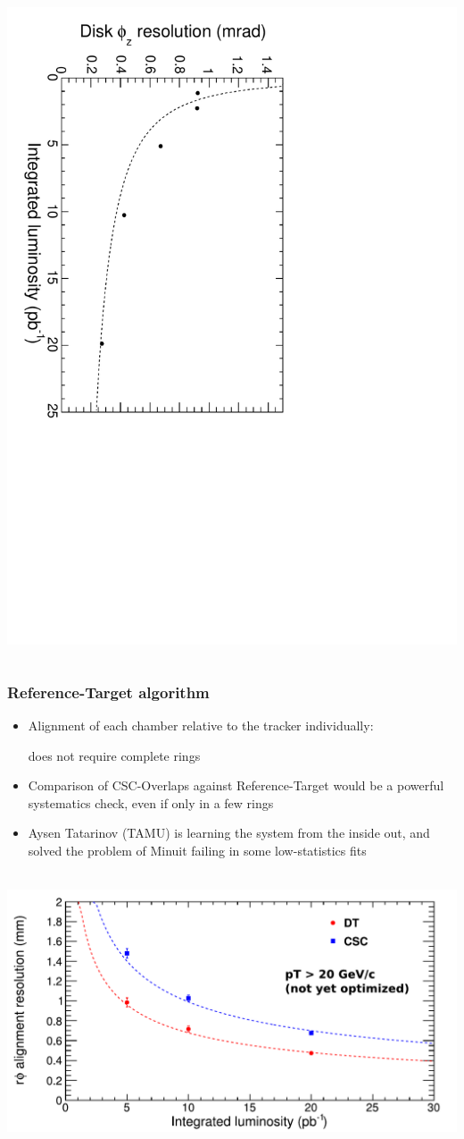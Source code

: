 \documentclass[compress]{beamer}
\begin{document}
\begin{frame}
\begin{columns}
\includegraphics[height=\linewidth, angle=90]{mccsc_diskstats_phiz.pdf}
\end{columns}
\end{frame}

\begin{frame}
\frametitle{Reference-Target algorithm}

\begin{itemize}
\item Alignment of each chamber relative to the tracker individually:

does not require complete rings
\item Comparison of CSC-Overlaps against Reference-Target would be a powerful systematics check, even if only in a few rings
\item Aysen Tatarinov (TAMU) is learning the system from the inside out, and solved the problem of Minuit failing in some low-statistics fits
\end{itemize}

\mbox{ } \hfill \includegraphics[width=0.87\linewidth]{resolution_vs_intlumi.pdf} \hfill \mbox{ }
\end{frame}
\end{document}
